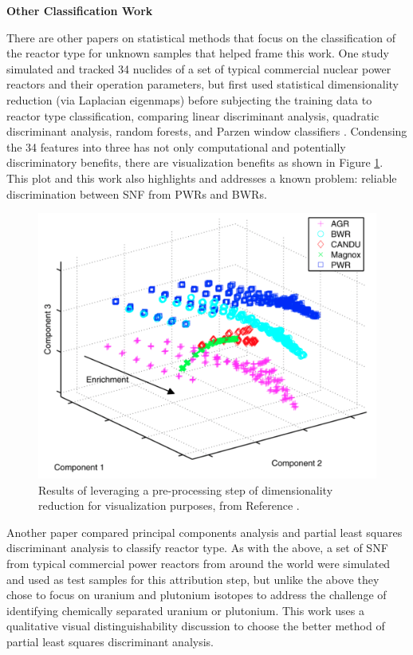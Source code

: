 \noindent \textbf{Other Classification Work}

There are other papers on statistical methods that focus on the classification
of the reactor type for unknown samples that helped frame this work.  One study
simulated and tracked 34 nuclides of a set of typical commercial nuclear power
reactors and their operation parameters, but first used statistical
dimensionality reduction (via Laplacian eigenmaps) before subjecting the
training data to reactor type classification, comparing linear discriminant
analysis, quadratic discriminant analysis, random forests, and Parzen window
classifiers \cite{jones_snf_2014}.  Condensing the 34 features into three has
not only computational and potentially discriminatory benefits, there are
visualization benefits as shown in Figure \ref{fig:jones}.  This plot and this
work also highlights and addresses a known problem: reliable discrimination
between \gls{SNF} from \glspl{PWR} and \glspl{BWR}. 

\begin{figure}[!htb]
  \centering
  \includegraphics[width=0.7\linewidth]{./chapters/litrev/jones.png}
  \caption{Results of leveraging a pre-processing step of dimensionality 
           reduction for visualization purposes, from Reference 
           \cite{jones_snf_2014}.}
  \label{fig:jones}
\end{figure}

Another paper compared principal components analysis and partial least squares
discriminant analysis to classify reactor type. As with the above, a set of
\gls{SNF} from typical commercial power reactors from around the world were
simulated and used as test samples for this attribution step, but unlike the
above they chose to focus on uranium and plutonium isotopes to address the
challenge of identifying chemically separated uranium or plutonium. This work
uses a qualitative visual distinguishability discussion to choose the better
method of partial least squares discriminant analysis.

